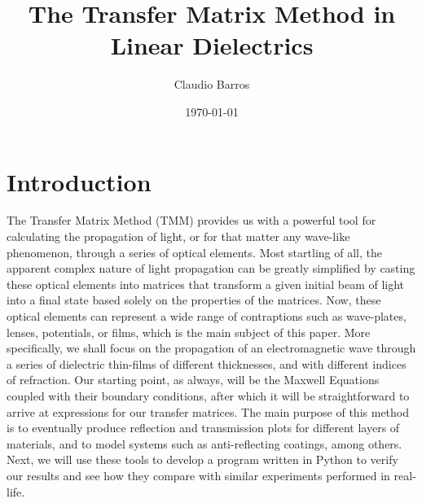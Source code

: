 \documentclass[preprint, onecolumn, amsmath, amssymb, aps]{revtex4-1}
\numberwithin{equation}{section}
\begin{document}
	
\title{The Transfer Matrix Method in Linear Dielectrics} 
	
\author{Claudio Barros}
	
	
\date{\today}

\renewcommand{\abstractname}{\vspace{0\baselineskip}}
	
\begin{abstract}
		
\end{abstract}
	
\maketitle
	
\section{Introduction}

The Transfer Matrix Method (TMM) provides us with a powerful tool for calculating the propagation of light, or for that matter any wave-like phenomenon, through a series of optical elements. Most startling of all, the apparent complex nature of light propagation can be greatly simplified by casting these optical elements into matrices that transform a given initial beam of light into a final state based solely on the properties of the matrices. Now, these optical elements can represent a wide range of contraptions such as wave-plates, lenses, potentials, or films, which is the main subject of this paper. More specifically, we shall focus on the propagation of an electromagnetic wave through a series of dielectric thin-films of different thicknesses, and with different indices of refraction. Our starting point, as always, will be the Maxwell Equations coupled with their boundary conditions, after which it will be straightforward to arrive at expressions for our transfer matrices. The main purpose of this method is to eventually produce reflection and transmission plots for different layers of materials, and to model systems such as anti-reflecting coatings, among others. Next, we will use these tools to develop a program written in Python to verify our results and see how they compare with similar experiments performed in real-life. 
\end{document}
